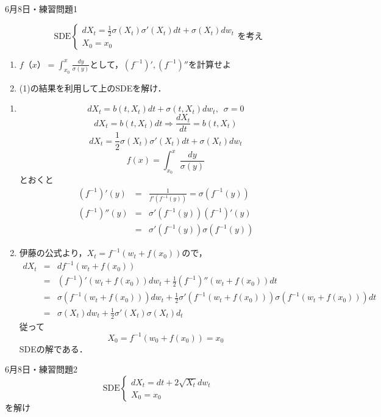 \documentclass{jsarticle}
\begin{document}
\begin{itembox}[l]{6月8日・練習問題1}

\begin{equation}
\text{SDE}
\begin{cases}
dX_t = \frac{1}{2} \sigma(X_t)\sigma'(X_t)dt + \sigma(X_t)dw_t \\
X_0 = x_0
\end{cases}を考え
\end{equation}
\begin{enumerate}
\item $f（x） = \int_{x_0}^x \frac{dy}{\sigma(y)}$として，$(f^{-1})',(f^{-1})''$を計算せよ
\item (1)の結果を利用して上のSDEを解け．
\end{enumerate}
\end{itembox}

\begin{enumerate}
\item 
\[dX_t = b(t,X_t)dt + \sigma(t,X_t)dw_t,\,\,\, \sigma = 0 \]
\[
dX_t = b(t,X_t)dt \Rightarrow \frac{dX_t}{dt} = b(t,X_t)
\]
\[
dX_t = \frac{1}{2} \sigma(X_t)\sigma'(X_t)dt + \sigma(X_t)dw_t
\]
\[
f(x) = \int_{x_0}^x \frac{dy}{\sigma(y)}
\]とおくと
\begin{eqnarray*}
(f^{-1})'(y) &=& \frac{1}{f'(f^{-1}(y))} = \sigma(f^{-1}(y)) \\
(f^{-1})''(y) &=& \sigma'(f^{-1}(y))(f^{-1})'(y) \\
&=& \sigma'(f^{-1}(y))\sigma(f^{-1}(y))
\end{eqnarray*}
\item
伊藤の公式より，$X_t=f^{-1}(w_t + f(x_0))$ので，
\begin{eqnarray*}
dX_t &=& df^{-1}(w_t + f(x_0))\\
&=& (f^{-1})'(w_t + f(x_0))dw_t + \frac{1}{2}(f^{-1})''(w_t + f(x_0))dt\\
&=& \sigma(f^{-1}(w_t + f(x_0)))dw_t + \frac{1}{2}\sigma'(f^{-1}(w_t + f(x_0)))\sigma(f^{-1}(w_t + f(x_0)))dt\\
&=& \sigma(X_t)dw_t + \frac{1}{2}\sigma'(X_t)\sigma(X_t)d_t
\end{eqnarray*}
従って
\[
X_0 = f^{-1}(w_0 + f(x_0)) = x_0 
\]
SDEの解である．

\end{enumerate}
\newpage
\begin{itembox}[l]{6月8日・練習問題2}
\begin{equation}
\text{SDE}
\begin{cases}
dX_t = dt + 2\sqrt{X_t} dw_t \\
X_0 = x_0
\end{cases}
\end{equation}
を解け
\end{itembox}
\end{document}
